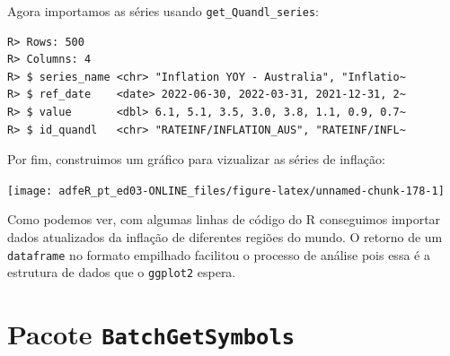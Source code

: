 \documentclass[
  11pt,
]{book}
\newenvironment{Shaded}{\begin{snugshade}}{\end{snugshade}}
\newcommand{\AttributeTok}[1]{\textcolor[rgb]{0.61,0.61,0.61}{#1}}
\newcommand{\FunctionTok}[1]{\textcolor[rgb]{0,0,0}{#1}}
\newcommand{\NormalTok}[1]{#1}
\newcommand{\OtherTok}[1]{\textcolor[rgb]{0.37,0.37,0.37}{#1}}
\newcommand{\SpecialCharTok}[1]{\textcolor[rgb]{0,0,0}{#1}}
\newcommand{\StringTok}[1]{\textcolor[rgb]{0.5,0.5,0.5}{#1}}
\begin{document}
Agora importamos as séries usando \texttt{get\_Quandl\_series}:

\begin{Shaded}
\end{Shaded}

\begin{verbatim}
R> Rows: 500
R> Columns: 4
R> $ series_name <chr> "Inflation YOY - Australia", "Inflatio~
R> $ ref_date    <date> 2022-06-30, 2022-03-31, 2021-12-31, 2~
R> $ value       <dbl> 6.1, 5.1, 3.5, 3.0, 3.8, 1.1, 0.9, 0.7~
R> $ id_quandl   <chr> "RATEINF/INFLATION_AUS", "RATEINF/INFL~
\end{verbatim}

Por fim, construimos um gráfico para vizualizar as séries de inflação:

\begin{center}\texttt{[image: adfeR\_pt\_ed03-ONLINE\_files/figure-latex/unnamed-chunk-178-1]} \end{center}

Como podemos ver, com algumas linhas de código do R conseguimos importar dados atualizados da inflação de diferentes regiões do mundo. O retorno de um \texttt{dataframe} no formato empilhado facilitou o processo de análise pois essa é a estrutura de dados que o \texttt{ggplot2} espera.

\hypertarget{pacote-batchgetsymbols}{%
\section{\texorpdfstring{Pacote \texttt{BatchGetSymbols}}{Pacote BatchGetSymbols}}\label{pacote-batchgetsymbols}}
\end{document}
